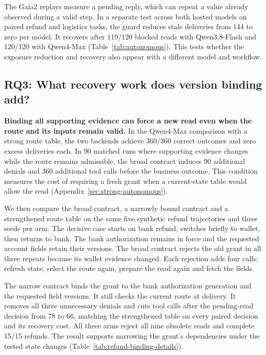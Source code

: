 The Gaia2 replays measure a pending reply, which can repeat a value already observed during a valid step. In a separate test across both hosted models on paired refund and logistics tasks, the guard reduces stale deliveries from 144 to zero per model. It recovers after 119/120 blocked reads with Qwen3.8-Flash and 120/120 with Qwen4-Max (Table~\ref{tab:autonomous}). This tests whether the exposure reduction and recovery also appear with a different model and workflow.

\subsection{RQ3: What recovery work does version binding add?}
\label{sec:rq-cost}

\textbf{Binding all supporting evidence can force a new read even when the route and its inputs remain valid.}
In the Qwen4-Max comparison with a strong route table, the two backends achieve 360/360 correct outcomes and zero excess deliveries each. In 90 matched runs where supporting evidence changes while the route remains admissible, the broad contract induces 90 additional denials and 360 additional tool calls before the business outcome. This condition measures the cost of requiring a fresh grant when a current-state table would allow the read (Appendix~\ref{sec:strong-autonomous}).

We then compare the broad contract, a narrowly bound contract and a strengthened route table on the same five synthetic refund trajectories and three seeds per arm. The decisive case starts on bank refund, switches briefly to wallet, then returns to bank. The bank authorization remains in force and the requested account fields retain their versions. The broad contract rejects the old grant in all three repeats because its wallet evidence changed. Each rejection adds four calls: refresh state, select the route again, prepare the read again and fetch the fields.

The narrow contract binds the grant to the bank authorization generation and the requested field versions. It still checks the current route at delivery. It removes all three unnecessary denials and cuts tool calls after the pending-read decision from 78 to 66, matching the strengthened table on every paired decision and its recovery cost. All three arms reject all nine obsolete reads and complete 15/15 refunds. The result supports narrowing the grant's dependencies under the tested state changes (Table~\ref{tab:refund-binding-details}).
